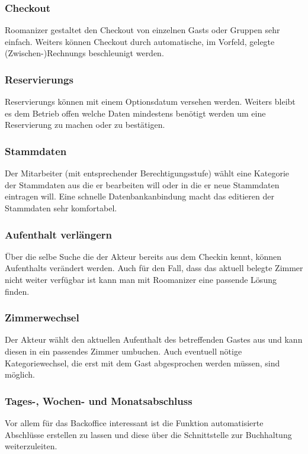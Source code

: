 \documentclass[10pt,a4paper,titlepage]{article}
\begin{document}
\subsubsection{\Gls{Checkout}}
Roomanizer gestaltet den \Gls{Checkout} von einzelnen \Glspl{Gast} oder Gruppen sehr einfach. Weiters können \Gls{Checkout} durch automatische, im Vorfeld, gelegte (Zwischen-)\Glspl{Rechnung} beschleunigt werden.

\subsubsection{\Glspl{Reservierung}}
\Glspl{Reservierung} können mit einem \Gls{Optionsdatum} versehen werden. Weiters bleibt es dem Betrieb offen welche Daten mindestens benötigt werden um eine \Gls{Reservierung} zu machen oder zu bestätigen.

\subsubsection{\Gls{Stammdaten}}
Der \Gls{Mitarbeiter} (mit entsprechender Berechtigungsstufe) wählt eine Kategorie der \Gls{Stammdaten} aus die er bearbeiten will oder in die er neue \Gls{Stammdaten} eintragen will. Eine schnelle Datenbankanbindung macht das editieren der \Gls{Stammdaten} sehr komfortabel.

\subsubsection{\Gls{Aufenthalt} verlängern}
Über die selbe Suche die der Akteur bereits aus dem \Gls{Checkin} kennt, können \Glspl{Aufenthalt} verändert werden. Auch für den Fall, dass das aktuell belegte \Gls{Zimmer} nicht weiter verfügbar ist kann man mit Roomanizer eine passende Lösung finden. 

\subsubsection{Zimmerwechsel}
Der Akteur wählt den aktuellen \Gls{Aufenthalt} des betreffenden \Gls{Gast}es aus und kann diesen in ein passendes \Gls{Zimmer} umbuchen. Auch eventuell nötige Kategoriewechsel, die erst mit dem \Gls{Gast} abgesprochen werden müssen, sind möglich.

\subsubsection{Tages-, Wochen- und Monatsabschluss}
Vor allem für das \Gls{Backoffice} interessant ist die Funktion automatisierte Abschlüsse erstellen zu lassen und diese über die Schnittstelle zur Buchhaltung weiterzuleiten.
\end{document}
